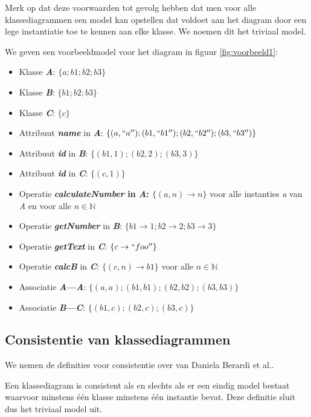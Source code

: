 Merk op dat deze voorwaarden tot gevolg hebben dat men voor alle klassediagrammen een model kan opstellen dat voldoet aan het diagram door een lege instantiatie toe te kennen aan elke klasse. We noemen dit het triviaal model.

We geven een voorbeeldmodel voor het diagram in figuur \ref{fig:voorbeeld1}:

\begin{itemize}
	\item Klasse \textbf{\textit{A}}: $\{a; b1; b2; b3\}$
	\item Klasse \textbf{\textit{B}}: $\{b1; b2; b3\}$
	\item Klasse \textbf{\textit{C}}: $\{c\}$
	\item Attribuut \textbf{\textit{name}} in \textbf{\textit{A}}: $\{(a,``a''); (b1,``b1''); (b2,``b2''); (b3,``b3'')\}$
	\item Attribuut \textbf{\textit{id}} in \textbf{\textit{B}}: $\{(b1,1);(b2,2);(b3,3)\}$
	\item Attribuut \textbf{\textit{id}} in \textbf{\textit{C}}: $\{(c,1)\}$
	\item Operatie \textbf{\textit{calculateNumber} in \textbf{\textit{A}}: $\{(a,n)\rightarrow{}n\}$} voor alle instanties \textit{a} van \textit{A} en voor alle $n \in \mathbb{N}$
	\item Operatie \textbf{\textit{getNumber}} in \textbf{\textit{B}}: $\{b1\rightarrow{}1; b2\rightarrow{}2; b3\rightarrow{}3\}$
	\item Operatie \textbf{\textit{getText}} in \textbf{\textit{C}}: $\{c\rightarrow{}``foo''\}$
	\item Operatie \textbf{\textit{calcB}} in \textbf{\textit{C}}: $\{(c,n)\rightarrow{}b1\}$ voor alle $n \in \mathbb{N}$
	\item Associatie \textbf{\textit{A}---\textit{A}}: $\{(a, a); (b1, b1); (b2, b2); (b3, b3)\}$
	\item Associatie \textbf{\textit{B}---\textit{C}}: $\{(b1,c); (b2,c); (b3,c)\}$
\end{itemize}

\subsection{Consistentie van klassediagrammen}

We nemen de definities voor consistentie over van Daniela Berardi et al.\cite{BerardiDaniela2005RoUc}.

Een klassediagram is consistent als en slechts als er een eindig model bestaat waarvoor minstens \'e\'en klasse minstens \'e\'en instantie bevat. Deze definitie sluit dus het triviaal model uit.

